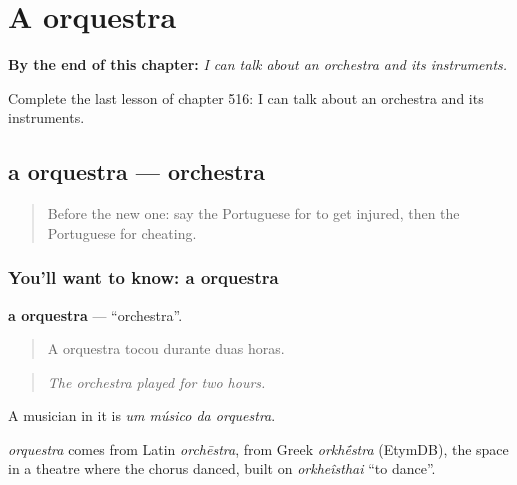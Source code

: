 
\chapter{A orquestra}
\label{ch:pt-a-orquestra}

\begin{chapteropening}
\textbf{By the end of this chapter:} \emph{I can talk about an orchestra and its instruments.}

Complete the last lesson of chapter 516: I can talk about an orchestra and its instruments.
\end{chapteropening}

\section[a orquestra]{a orquestra — orchestra}

\label{lesson:PT-C516-orquestra}



\begin{quote}
Before the new one: say the Portuguese for to get injured, then the Portuguese for cheating.
\end{quote}

\subsection*{You'll want to know: a orquestra}
\textbf{a orquestra} — \textquotedblleft{}orchestra\textquotedblright{}.

\begin{quote}
A orquestra tocou durante duas horas.
\end{quote}

\begin{quote}
\emph{The orchestra played for two hours.}
\end{quote}

A musician in it is \emph{um músico da orquestra}.

\begin{cousinweb}
\emph{orquestra} comes from Latin \emph{orchēstra}, from Greek \emph{orkh\'{\={e}}stra} (EtymDB), the space in a theatre where the chorus danced, built on \emph{orkheîsthai} \textquotedblleft{}to dance\textquotedblright{}.
\end{cousinweb}

